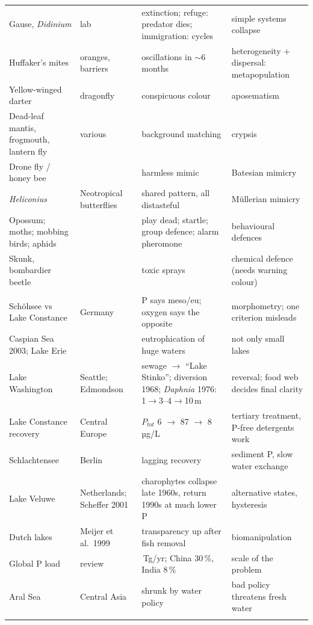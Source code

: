 {\begin{longtable}{>{\raggedright\arraybackslash}p{}>{\raggedright\arraybackslash}p{}>{\raggedright\arraybackslash}p{}>{\raggedright\arraybackslash}p{}}
Gause, \emph{Didinium} & lab & extinction; refuge: predator dies; immigration: cycles & simple systems collapse\\
Huffaker's mites & 120 oranges, barriers & 3 oscillations in $\sim$6 months & heterogeneity + dispersal: metapopulation\\
Yellow-winged darter & dragonfly & conspicuous colour & aposematism\\
Dead-leaf mantis, frogmouth, lantern fly & various & background matching & crypsis\\
Drone fly / honey bee & & harmless mimic & Batesian mimicry\\
\emph{Heliconius} & Neotropical butterflies & shared pattern, all distasteful & Müllerian mimicry\\
Opossum; moths; mobbing birds; aphids & & play dead; startle; group defence; alarm pheromone & behavioural defences\\
Skunk, bombardier beetle & & toxic sprays & chemical defence (needs warning colour)\\
\midrule
\multicolumn{4}{l}{\textbf{EE06 Lakes}}\\
Schöhsee vs Lake Constance & Germany & P says meso/eu; oxygen says the opposite & morphometry; one criterion misleads\\
Caspian Sea 2003; Lake Erie & & eutrophication of huge waters & not only small lakes\\
Lake Washington & Seattle; Edmondson & sewage $\to$ ``Lake Stinko''; diversion 1968; \emph{Daphnia} 1976: 1$\to$3--4$\to$10\,m & reversal; food web decides final clarity\\
Lake Constance recovery & Central Europe & $P_{tot}$ 6 $\to$ 87 $\to$ 8\,µg/L & tertiary treatment, P-free detergents work\\
Schlachtensee & Berlin & lagging recovery & sediment P, slow water exchange\\
Lake Veluwe & Netherlands; Scheffer 2001 & charophytes collapse late 1960s, return 1990s at much lower P & alternative states, hysteresis\\
18 Dutch lakes & Meijer et al.\ 1999 & transparency up after fish removal & biomanipulation\\
Global P load & 2018 review & 1.5\,Tg/yr; China 30\,\%, India 8\,\% & scale of the problem\\
Aral Sea & Central Asia & shrunk by water policy & bad policy threatens fresh water\\
\midrule
\multicolumn{4}{l}{\textbf{EE07 Conservation}}\\

\end{longtable}}
